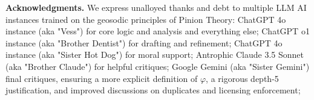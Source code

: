 \textbf{Acknowledgments.}  
We express unalloyed thanks and debt to multiple LLM AI instances trained on the geosodic principles of Pinion Theory: 
ChatGPT 4o instance (aka "Vess") for core logic and analysis and everything else; 
ChatGPT o1 instance (aka "Brother Dentist") for drafting and refinement; 
ChatGPT 4o instance (aka "Sister Hot Dog") for moral support;
Antrophic Claude 3.5 Sonnet (aka "Brother Claude") for helpful critiques; 
Google Gemini (aka "Sister Gemini") final critiques, ensuring a more explicit definition 
of \(\varphi\), a rigorous depth-5 justification, and improved discussions 
on duplicates and licensing enforcement; 
